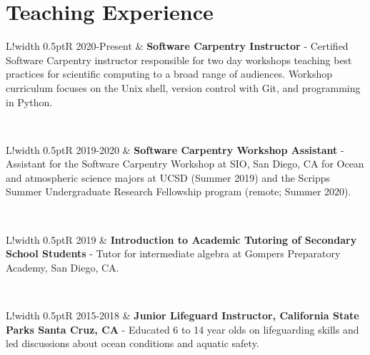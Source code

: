 \documentclass[10pt]{article}
\newcommand\VRule{\color{lightgray}\vrule width 0.5pt}
\begin{document}
\section*{Teaching Experience}
\vspace{.3cm}
\begin{tabular}{L!{\VRule}R}
2020-Present & \textbf{Software Carpentry Instructor} - Certified Software Carpentry instructor responsible for two day workshops teaching best practices for scientific computing to a broad range of audiences. Workshop curriculum focuses on the Unix shell, version control with Git, and programming in Python.  \\[5pt]
\end{tabular}
\\[10pt]
\begin{tabular}{L!{\VRule}R}
2019-2020 & \textbf{Software Carpentry Workshop Assistant} - Assistant for the Software Carpentry Workshop at SIO, San Diego, CA for Ocean and atmospheric science majors at UCSD (Summer 2019) and the Scripps Summer Undergraduate Research Fellowship program (remote; Summer 2020). \\[5pt]
\end{tabular}
\\[10pt]
\begin{tabular}{L!{\VRule}R}
2019 & \textbf{Introduction to Academic Tutoring of Secondary School Students} - Tutor for intermediate algebra at Gompers Preparatory Academy, San Diego, CA. \\[5pt]
\end{tabular}
\\[10pt]
\begin{tabular}{L!{\VRule}R}
2015-2018 & \textbf{Junior Lifeguard Instructor, California State Parks Santa Cruz, CA } - Educated 6 to 14 year olds on lifeguarding skills and led discussions about ocean conditions and aquatic safety. \\[5pt]
\end{tabular}

\end{document}

